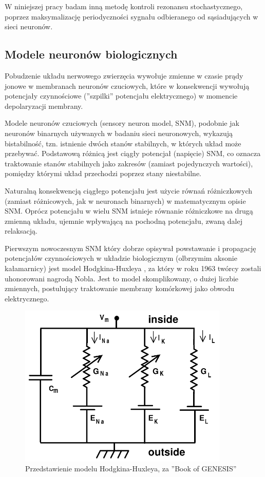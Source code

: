   W niniejszej pracy badam inną metodę kontroli rezonansu stochastycznego, poprzez maksymalizację periodyczności sygnału odbieranego od sąsiadujących w sieci neuronów.
  
  \subsection{Modele neuronów biologicznych}
  
  Pobudzenie układu nerwowego zwierzęcia wywołuje zmienne w czasie prądy jonowe w membranach neuronów czuciowych, które w konsekwencji wywołują potencjały czynnościowe (''szpilki'' potencjału elektrycznego) w momencie depolaryzacji membrany.
  
  Modele neuronów czuciowych (sensory neuron model, SNM), podobnie jak neuronów binarnych używanych w badaniu sieci neuronowych, wykazują bistabilność, tzn. istnienie dwóch stanów stabilnych, w których układ może przebywać. Podstawową różnicą jest ciągły potencjał (napięcie) SNM, co oznacza traktowanie stanów stabilnych jako zakresów (zamiast pojedynczych wartości), pomiędzy którymi układ przechodzi poprzez stany niestabilne. 
  
  Naturalną konsekwencją ciągłego potencjału jest użycie równań różniczkowych (zamiast różnicowych, jak w neuronach binarnych) w matematycznym opisie SNM. Oprócz potencjału w wielu SNM istnieje równanie różniczkowe na drugą zmienną układu, ujemnie wpływającą na pochodną potencjału, zwaną dalej relaksacją.
  
  Pierwszym nowoczesnym SNM który dobrze opisywał powstawanie i propagację potencjałów czynnościowych w układzie biologicznym (olbrzymim aksonie kałamarnicy) jest model Hodgkina-Huxleya \cite{hodgkin}, za który w roku 1963 twórcy zostali uhonorowani nagrodą Nobla. Jest to model skomplikowany, o dużej liczbie zmiennych, postulujący traktowanie membrany komórkowej jako obwodu elektrycznego.

  \begin{figure}
    \includegraphics[width=100mm]{images/hh.png}
    \caption{Przedstawienie modelu Hodgkina-Huxleya, za ''Book of GENESIS'' \cite{genesis}}
    \label{fig:graphics:genesis}
  \end{figure}

